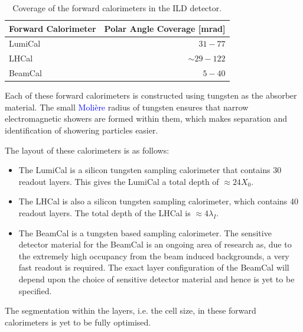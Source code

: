 \begin{table}[h!]
\centering
\begin{tabular}{ l r }
\hline
Forward Calorimeter & Polar Angle Coverage [mrad] \\
\hline
LumiCal & $31 - 77$ \\
LHCal & $\sim 29 - 122$ \\
BeamCal & $5 - 40$ \\
\hline
\end{tabular}
\caption[Coverage of the forward calorimeters in the ILD detector.]{Coverage of the forward calorimeters in the ILD detector.}
\label{table:fcalcoverage}
\end{table}

Each of these forward calorimeters is constructed using tungsten as the absorber material.  The small \textcolor{blue}{Moli\`{e}re} radius of tungsten ensures that narrow electromagnetic showers are formed within them, which makes separation and identification of showering particles easier.  

The layout of these calorimeters is as follows:
\begin{itemize}
\item The LumiCal is a silicon tungsten sampling calorimeter that contains 30 readout layers.  This gives the LumiCal a total depth of $\approx 24 X_{0}$.  
\item The LHCal is also a silicon tungsten sampling calorimeter, which contains 40 readout layers.  The total depth of the LHCal is $\approx 4 \lambda_{I}$.
\item The BeamCal is a tungsten based sampling calorimeter.  The sensitive detector material for the BeamCal is an ongoing area of research as, due to the extremely high occupancy from the beam induced backgrounds, a very fast readout is required.  The exact layer configuration of the BeamCal will depend upon the choice of sensitive detector material and hence is yet to be specified.  
\end{itemize}
The segmentation within the layers, i.e. the cell size, in these forward calorimeters is yet to be fully optimised.


